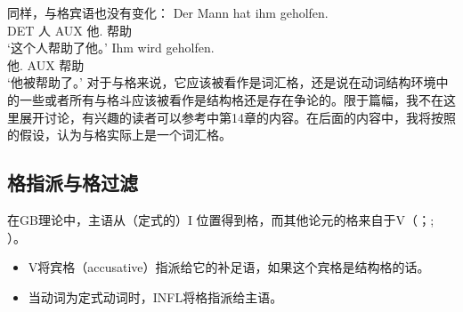 同样，与格宾语也没有变化：
\eal
\ex 
\gll Der Mann hat ihm geholfen.\\
	 DET 人 AUX 他.\dat{} 帮助\\
\glt `这个人帮助了他。'
\ex 
\gll Ihm wird geholfen.\\
	 他.\dat{} AUX 帮助\\
\glt `他被帮助了。'
\zl
对于与格来说，它应该被看作是词汇格，还是说在动词结构环境中的一些或者所有与格斗应该被看作是结构格还是存在争论的。限于篇幅，我不在这里展开讨论，有兴趣的读者可以参考中第14章的内容。在后面的内容中，我将按照\citet[]{Haider86} 的假设，认为与格实际上是一个词汇格。 



\subsection{格指派与格过滤}
\label{sec-case-assignment}

在GB理论中，主语从（定式的）I 位置得到格，而其他论元的格来自于V（\citealp[]{Chomsky81a}；\citealp[]{Haider84b}; \citealp[--73]{FF87}）。
\begin{principle-break}[格指派原则]\label{Kasusprinzip-GB}
\begin{itemize}
\item V将宾格（accusative）指派给它的补足语，如果这个宾格是结构格的话。 
\item 当动词为定式动词时，INFL将格指派给主语。 
\end{itemize}
\end{principle-break}


